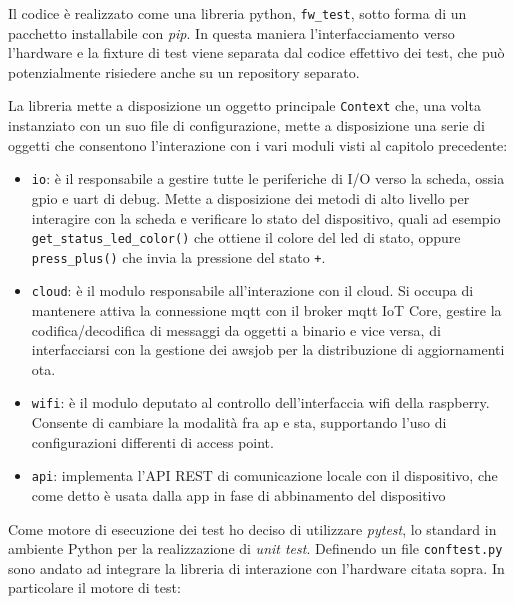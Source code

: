 \documentclass[12pt,a4paper,twoside,titlepage]{book}
\begin{document}
Il codice è realizzato come una libreria python, \texttt{fw\_test}, sotto forma di
un pacchetto installabile con \textit{pip}. In questa maniera l'interfacciamento
verso l'hardware e la fixture di test viene separata dal codice effettivo dei test,
che può potenzialmente risiedere anche su un repository separato.

La libreria mette a disposizione un oggetto principale \texttt{Context} che, una
volta instanziato con un suo file di configurazione, mette a disposizione una serie
di oggetti che consentono l'interazione con i vari moduli visti al capitolo precedente:

\begin{itemize}
    \item \texttt{io}: è il responsabile a gestire tutte le periferiche di I/O
        verso la scheda, ossia \Gls{gpio} e \Gls{uart} di debug. Mette a disposizione dei metodi di
        alto livello per interagire con la scheda e verificare lo stato del dispositivo,
        quali ad esempio \texttt{get\_status\_led\_color()} che ottiene il colore del
        \acrshort{led} di stato, oppure \texttt{press\_plus()} che invia la pressione del stato \texttt{+}.
    \item \texttt{cloud}: è il modulo responsabile all'interazione con il cloud. Si
        occupa di mantenere attiva la connessione \Gls{mqtt} con il broker \Gls{mqtt} IoT Core,
        gestire la codifica/decodifica di messaggi da oggetti a binario e vice versa,
        di interfacciarsi con la gestione dei \Gls{awsjob} per la distribuzione di aggiornamenti
        \acrshort{ota}.
    \item \texttt{wifi}: è il modulo deputato al controllo dell'interfaccia \Gls{wifi}
        della raspberry. Consente di cambiare la modalità fra \acrshort{ap} e \acrshort{sta},
        supportando l'uso di configurazioni differenti di access point.
    \item \texttt{api}: implementa l'API REST di comunicazione locale con il dispositivo,
        che come detto è usata dalla app in fase di abbinamento del dispositivo
\end{itemize}

Come motore di esecuzione dei test ho deciso di utilizzare \textit{pytest}, lo standard 
in ambiente Python per la realizzazione di \textit{unit test}. Definendo un file \texttt{conftest.py}
sono andato ad integrare la libreria di interazione con l'hardware citata sopra. In particolare il motore di test:
\end{document}
